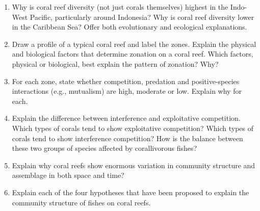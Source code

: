 \documentclass[nofonts, letterpaper]{tufte-handout}
\begin{document}
\begin{enumerate}
\item
  Why is coral reef diversity (not just corals themselves) highest in
  the Indo-West Pacific, particularly around Indonesia? Why is coral
  reef diversity lower in the Caribbean Sea? Offer both evolutionary and
  ecological explanations.

\item
  Draw a profile of a typical coral reef and label the zones. Explain
  the physical and biological factors that determine zonation on a coral
  reef. Which factors, physical or biological, best explain the pattern
  of zonation? Why?

\item
  For each zone, state whether competition, predation and
  positive-species interactions (e.g., mutualism) are high, moderate or
  low. Explain why for each.
  
\item
  Explain the difference between interference and exploitative
  competition. Which types of corals tend to show exploitative
  competition? Which types of corals tend to show interference
  competition? How is the balance between these two groups of species
  affected by corallivorous fishes?

\item
  Explain why coral reefs show enormous variation in community structure
  and assemblage in both space and time?
  
\item
  Explain each of the four hypotheses that have been proposed to explain the
  community structure of fishes on coral reefs.

\end{enumerate}
\end{document}
